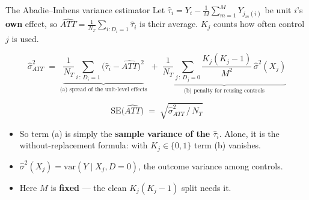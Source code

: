 \documentclass[
  11pt,
  ignorenonframetext,
  aspectratio=169,
]{beamer}
\providecommand{\tightlist}{%
  \setlength{\itemsep}{0pt}\setlength{\parskip}{0pt}}
\begin{document}
\begin{frame}{The Abadie--Imbens variance estimator}
\protect{}\label{the-abadieimbens-variance-estimator}
Let \(\hat\tau_i = Y_i - \frac{1}{M}\sum_{m=1}^{M} Y_{j_m(i)}\) be unit
\(i\)'s \textbf{own} effect, so
\(\widehat{ATT} = \frac{1}{N_T}\sum_{i:D_i=1}\hat\tau_i\) is their
average. \(K_j\) counts how often control \(j\) is used.

\[
\hat\sigma^2_{ATT} \;=\;
\underbrace{\frac{1}{N_T}\sum_{i\,:\,D_i=1}\big(\hat\tau_i - \widehat{ATT}\big)^2}_{\text{(a) spread of the unit-level effects}}
\;+\;
\underbrace{\frac{1}{N_T}\sum_{j\,:\,D_j=0}\frac{K_j(K_j-1)}{M^2}\,\hat\sigma^2(X_j)}_{\text{(b) penalty for reusing controls}}
\]

\[
\mathrm{SE}\big(\widehat{ATT}\big) \;=\; \sqrt{\hat\sigma^2_{ATT} \,\big/\, N_T}
\]

\begin{itemize}
\tightlist
\item
  So term (a) is simply the \textbf{sample variance of the
  \(\hat\tau_i\)}. Alone, it is the without-replacement formula: with
  \(K_j \in \{0,1\}\) term (b) vanishes.
\item
  \(\hat\sigma^2(X_j) = \mathrm{var}(Y \mid X_j, D{=}0)\), the outcome
  variance among controls.
\item
  Here \(M\) is \textbf{fixed} --- the clean \(K_j(K_j{-}1)\) split
  needs it.
\end{itemize}
\end{frame}
\end{document}
